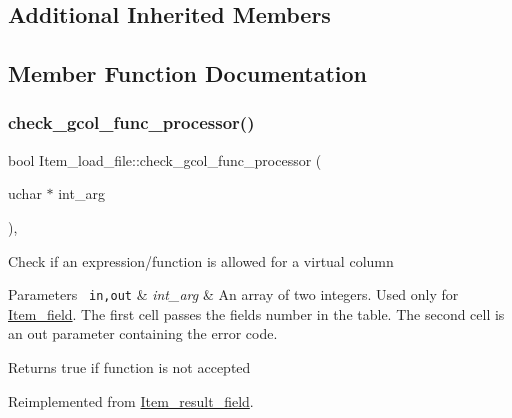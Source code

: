 \subsection*{Additional Inherited Members}


\subsection{Member Function Documentation}
\mbox{\label{classItem__load__file_a1be538400bc26d5fd2f1ee075bb11be5}} 
\subsubsection{\texorpdfstring{check\+\_\+gcol\+\_\+func\+\_\+processor()}{check\_gcol\_func\_processor()}}
{\footnotesize\ttfamily bool Item\+\_\+load\+\_\+file\+::check\+\_\+gcol\+\_\+func\+\_\+processor (\begin{DoxyParamCaption}\item[{uchar $\ast$}]{int\+\_\+arg }\end{DoxyParamCaption})\hspace{0.3cm}{\ttfamily [inline]}, {\ttfamily [virtual]}}

Check if an expression/function is allowed for a virtual column


\begin{DoxyParams}[1]{Parameters}
\mbox{\texttt{ in,out}}  & {\em int\+\_\+arg} & An array of two integers. Used only for \mbox{\hyperlink{classItem__field}{Item\+\_\+field}}. The first cell passes the field\textquotesingle{}s number in the table. The second cell is an out parameter containing the error code.\\
\hline
\end{DoxyParams}
\begin{DoxyReturn}{Returns}
true if function is not accepted 
\end{DoxyReturn}


Reimplemented from \mbox{\hyperlink{classItem__result__field_a12324702e7f419b47de45e3505730441}{Item\+\_\+result\+\_\+field}}.

\mbox{\label{classItem__load__file_a3181c3542fe37a8a9b9842beeb384943}} 
